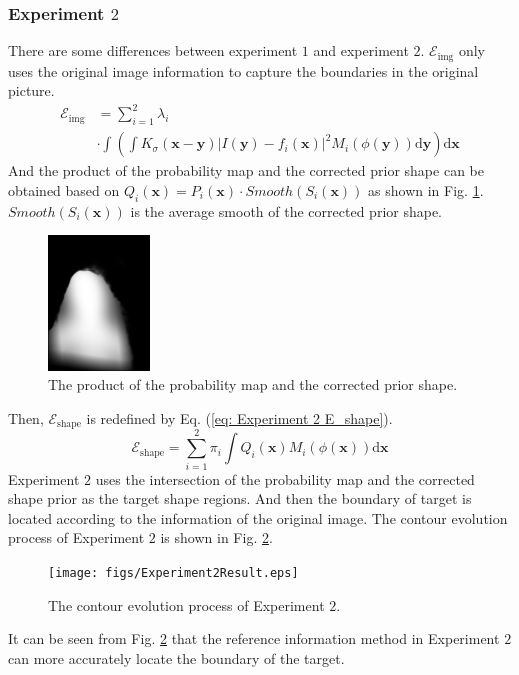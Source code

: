 \subsubsection{Experiment $2$}
There are some differences between experiment $1$ and experiment $2$. $\mathcal{E}_{\text{img}}$ only uses the original image information to capture the boundaries in the original picture.
\begin{equation}
\begin{split}
    \mathcal{E}_{\text{img}} & = \sum_{i=1}^2 \lambda_i \\
     &\cdot \int\left( \int K_\sigma(\mathbf{x}-\mathbf{y}) \left| I(\mathbf{y}) - f_i(\mathbf{x}) \right|^2 M_i(\phi(\mathbf{y}))\mathrm{d}\mathbf{y} \right)\mathrm{d}\mathbf{x}
\end{split}
\end{equation}
And the product of the probability map and the corrected prior shape can be obtained based on $Q_i(\mathbf{x}) = P_i(\mathbf{x})\cdot Smooth(S_i(\mathbf{x}))$ as shown in Fig. \ref{fig: The product of the probability map and the corrected prior shape}. $Smooth(S_i(\mathbf{x}))$ is the average smooth of the corrected prior shape.
\begin{figure}[h]
    \centering
    \includegraphics[width=2.7cm]{figs/Experiment2_plus.jpg}
    \caption{The product of the probability map and the corrected prior shape.}
    \label{fig: The product of the probability map and the corrected prior shape}
\end{figure}
Then, $\mathcal{E}_{\text{shape}}$ is redefined by Eq. (\ref{eq: Experiment 2 E_shape}).
\begin{equation}\label{eq: Experiment 2 E_shape}
    \mathcal{E}_{\text{shape}} = \sum_{i=1}^2 \pi_i \int Q_i(\mathbf{x}) M_i(\phi(\mathbf{x})) \mathrm{d}\mathbf{x}
\end{equation}
Experiment $2$ uses the intersection of the probability map and the corrected shape prior as the target shape regions. And then the boundary of target is located according to the information of the original image. The contour evolution process of Experiment $2$ is shown in Fig. \ref{fig: The contour evolution process of Experiment 2}.
\begin{figure}[h]
    \centering
    \texttt{[image: figs/Experiment2Result.eps]}
    \caption{The contour evolution process of Experiment $2$.}
    \label{fig: The contour evolution process of Experiment 2}
\end{figure}
It can be seen from Fig. \ref{fig: The contour evolution process of Experiment 2} that the reference information method in Experiment $2$ can more accurately locate the boundary of the target.
